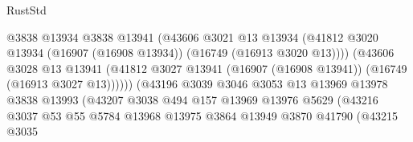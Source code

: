 \begin{lexlean}{RustStd}
\begin{coremodule}
                                          @3838
                                          @13934
                                          @3838
                                          @13941
                                          (@43606
                                            @3021
                                            @13
                                            @13934
                                            (@41812
                                              @3020
                                              @13934
                                              (@16907 (@16908 @13934))
                                              (@16749 (@16913 @3020 @13))))
                                          (@43606
                                            @3028
                                            @13
                                            @13941
                                            (@41812
                                              @3027
                                              @13941
                                              (@16907 (@16908 @13941))
                                              (@16749 (@16913 @3027 @13))))))
                                      (@43196
                                        @3039
                                        @3046
                                        @3053
                                        @13
                                        @13969
                                        @13978
                                        @3838
                                        @13993
                                        (@43207
                                          @3038
                                          @494
                                          @157
                                          @13969
                                          @13976
                                          @5629
                                          (@43216
                                            @3037
                                            @53
                                            @55
                                            @5784
                                            @13968
                                            @13975
                                            @3864
                                            @13949
                                            @3870
                                            @41790
                                            (@43215
                                              @3035

\end{coremodule}
\end{lexlean}
